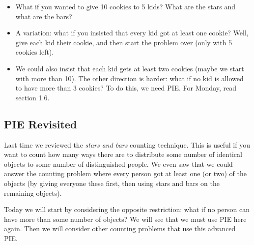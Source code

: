 \documentclass[12pt]{article}
\theoremstyle{plain}
\theoremstyle{definition}
\theoremstyle{remark}
\newcommand{\todayis}[1]{\clearpage{\rhead{\footnotesize #1}}}
\begin{document}
\begin{itemize}
\item What if you wanted to give 10 cookies to 5 kids?  What are the stars and what are the bars?

\item A variation: what if you insisted that every kid got at least one cookie?  Well, give each kid their cookie, and then start the problem over (only with 5 cookies left).

\item We could also insist that each kid gets at least two cookies (maybe we start with more than 10).  The other direction is harder: what if no kid is allowed to have more than 3 cookies?  To do this, we need PIE.  For Monday, read section 1.6.

\end{itemize}



\todayis{Monday, September 18}
\subsection*{PIE Revisited}
Last time we reviewed the {\em stars and bars} counting technique.  This is useful if you want to count how many ways there are to distribute some number of identical objects to some number of distinguished people.  We even saw that we could answer the counting problem where every person got at least one (or two) of the objects (by giving everyone these first, then using stars and bars on the remaining objects).

Today we will start by considering the opposite restriction: what if no person can have more than some number of objects?  We will see that we must use PIE here again.  Then we will consider other counting problems that use this advanced PIE.
\end{document}
